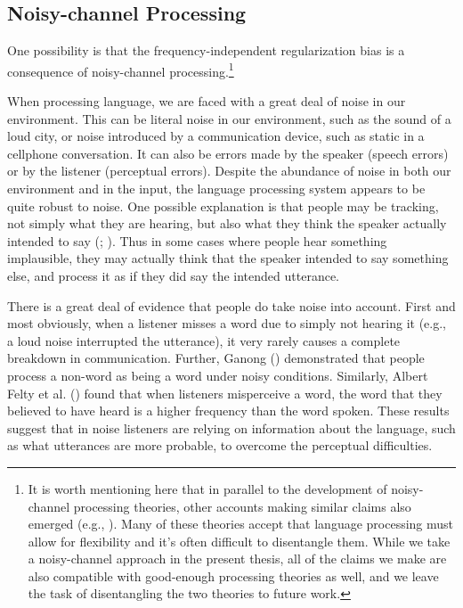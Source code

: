 \documentclass[
  12pt,
]{scrartcl}
\begin{document}
\subsection{Noisy-channel Processing}\label{noisy-channel-processing}

One possibility is that the frequency-independent regularization bias is
a consequence of noisy-channel processing.\footnote{It is worth
  mentioning here that in parallel to the development of noisy-channel
  processing theories, other accounts making similar claims also emerged
  (e.g., ). Many of these theories accept that language processing
  must allow for flexibility and it's often difficult to disentangle
  them. While we take a noisy-channel approach in the present thesis,
  all of the claims we make are also compatible with good-enough
  processing theories as well, and we leave the task of disentangling
  the two theories to future work.}

When processing language, we are faced with a great deal of noise in our
environment. This can be literal noise in our environment, such as the
sound of a loud city, or noise introduced by a communication device,
such as static in a cellphone conversation. It can also be errors made
by the speaker (speech errors) or by the listener (perceptual errors).
Despite the abundance of noise in both our environment and in the input,
the language processing system appears to be quite robust to noise. One
possible explanation is that people may be tracking, not simply what
they are hearing, but also what they think the speaker actually intended
to say
(; ).
Thus in some cases where people hear something implausible, they may
actually think that the speaker intended to say something else, and
process it as if they did say the intended utterance.

There is a great deal of evidence that people do take noise into
account. First and most obviously, when a listener misses a word due to
simply not hearing it (e.g., a loud noise interrupted the utterance), it
very rarely causes a complete breakdown in communication. Further,
Ganong ()
demonstrated that people process a non-word as being a word under noisy
conditions. Similarly, Albert Felty et al.
() found that when
listeners misperceive a word, the word that they believed to have heard
is a higher frequency than the word spoken. These results suggest that
in noise listeners are relying on information about the language, such
as what utterances are more probable, to overcome the perceptual
difficulties.
\end{document}

